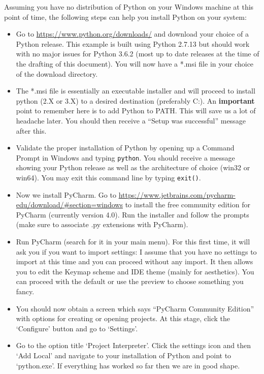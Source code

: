 \documentclass{article}
\begin{document}
Assuming you have no distribution of Python on your Windows machine at this point of time, the following steps can help you install Python on your system:
\begin{itemize}

  \item Go to \url{https://www.python.org/downloads/} and download your choice of a Python release. This example is built using Python 2.7.13 but should work with no major issues for Python 3.6.2 (most up to date releases at the time of the drafting of this document). You will now have a *.msi file in your choice of the download directory.

  \item The *.msi file is essentially an executable installer and will proceed to install python (2.X or 3.X) to a desired destination (preferably C:). An \textbf{important} point to remember here is to add Python to PATH. This will save us a lot of headache later. You should then receive a ``Setup was successful'' message after this.

  \item Validate the proper installation of Python by opening up a Command Prompt in Windows and typing \texttt{python}. You should receive a message showing your Python release as well as the architecture of choice (win32 or win64). You may exit this command line by typing \texttt{exit()}.

  \item Now we install PyCharm. Go to \url{https://www.jetbrains.com/pycharm-edu/download/#section=windows} to install the free community edition for PyCharm (currently version 4.0). Run the installer and follow the prompts (make sure to associate .py extensions with PyCharm).
  \item Run PyCharm (search for it in your main menu). For this first time, it will ask you if you want to import settings: I assume that you have no settings to import at this time and you can proceed without any import. It then allows you to edit the Keymap scheme and IDE theme (mainly for aesthetics). You can proceed with the default or use the preview to choose something you fancy.
  \item You should now obtain a screen which says ``PyCharm Community Edition'' with options for creating or opening projects. At this stage, click the `Configure' button and go to `Settings'.
  \item Go to the option title `Project Interpreter'. Click the settings icon and then `Add Local' and navigate to your installation of Python and point to `python.exe'. If everything has worked so far then we are in good shape.
\end{itemize}
\end{document}
